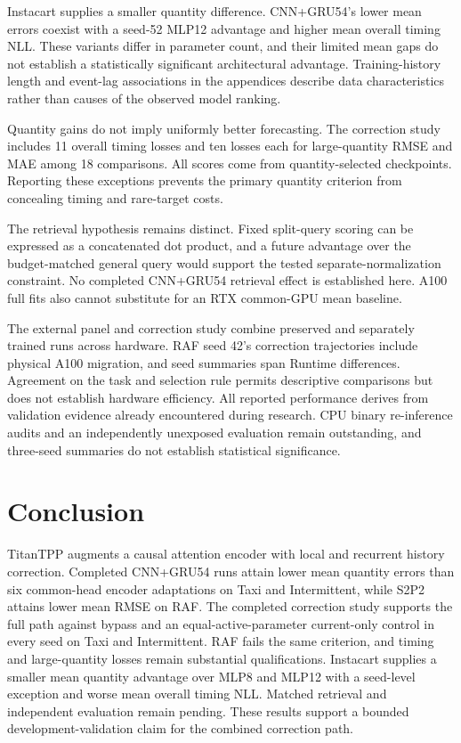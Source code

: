 \documentclass[runningheads]{llncs}
\begin{document}
Instacart supplies a smaller quantity difference. CNN+GRU54's lower mean errors coexist with a seed-52 MLP12 advantage and higher mean overall timing NLL. These variants differ in parameter count, and their limited mean gaps do not establish a statistically significant architectural advantage. Training-history length and event-lag associations in the appendices describe data characteristics rather than causes of the observed model ranking.

Quantity gains do not imply uniformly better forecasting. The correction study includes 11 overall timing losses and ten losses each for large-quantity RMSE and MAE among 18 comparisons. All scores come from quantity-selected checkpoints. Reporting these exceptions prevents the primary quantity criterion from concealing timing and rare-target costs.

The retrieval hypothesis remains distinct. Fixed split-query scoring can be expressed as a concatenated dot product, and a future advantage over the budget-matched general query would support the tested separate-normalization constraint. No completed CNN+GRU54 retrieval effect is established here. A100 full fits also cannot substitute for an RTX common-GPU mean baseline.

The external panel and correction study combine preserved and separately trained runs across hardware. RAF seed 42's correction trajectories include physical A100 migration, and seed summaries span Runtime differences. Agreement on the task and selection rule permits descriptive comparisons but does not establish hardware efficiency. All reported performance derives from validation evidence already encountered during research. CPU binary re-inference audits and an independently unexposed evaluation remain outstanding, and three-seed summaries do not establish statistical significance.

\section{Conclusion}
TitanTPP augments a causal attention encoder with local and recurrent history correction. Completed CNN+GRU54 runs attain lower mean quantity errors than six common-head encoder adaptations on Taxi and Intermittent, while S2P2 attains lower mean RMSE on RAF. The completed correction study supports the full path against bypass and an equal-active-parameter current-only control in every seed on Taxi and Intermittent. RAF fails the same criterion, and timing and large-quantity losses remain substantial qualifications. Instacart supplies a smaller mean quantity advantage over MLP8 and MLP12 with a seed-level exception and worse mean overall timing NLL. Matched retrieval and independent evaluation remain pending. These results support a bounded development-validation claim for the combined correction path.
\end{document}
